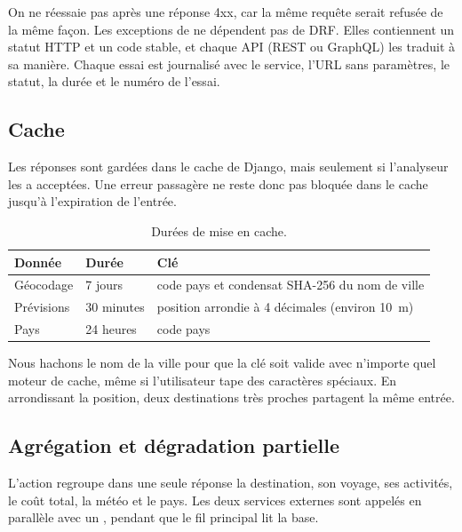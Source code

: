 On ne réessaie pas après une réponse 4xx, car la même requête serait refusée de la même façon. Les exceptions de  ne dépendent pas de DRF. Elles contiennent un statut HTTP et un code stable, et chaque API (REST ou GraphQL) les traduit à sa manière. Chaque essai est journalisé avec le service, l'URL sans paramètres, le statut, la durée et le numéro de l'essai.

\subsection{Cache}

Les réponses sont gardées dans le cache de Django, mais seulement si l'analyseur les a acceptées. Une erreur passagère ne reste donc pas bloquée dans le cache jusqu'à l'expiration de l'entrée.

\begin{table}[H]
  \centering
  \small
  \caption{Durées de mise en cache.}
  \label{tab:cache}
  \begin{tabularx}{\linewidth}{@{}l l X@{}}
    \toprule
    \textbf{Donnée} & \textbf{Durée} & \textbf{Clé} \\
    \midrule
    Géocodage & 7 jours & code pays et condensat SHA-256 du nom de ville \\
    Prévisions & 30 minutes & position arrondie à 4 décimales (environ 10~m) \\
    Pays & 24 heures & code pays \\
    \bottomrule
  \end{tabularx}
\end{table}

Nous hachons le nom de la ville pour que la clé soit valide avec n'importe quel moteur de cache, même si l'utilisateur tape des caractères spéciaux. En arrondissant la position, deux destinations très proches partagent la même entrée.

\subsection{Agrégation et dégradation partielle}

L'action  regroupe dans une seule réponse la destination, son voyage, ses activités, le coût total, la météo et le pays. Les deux services externes sont appelés en parallèle avec un , pendant que le fil principal lit la base.

